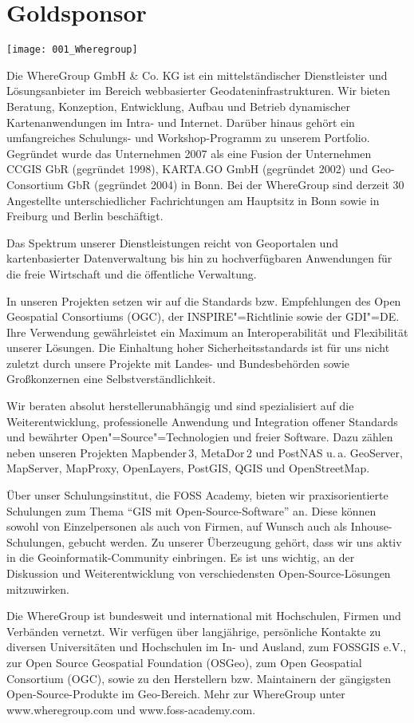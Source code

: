 \section*{Goldsponsor}
\begin{center}
	\texttt{[image: 001\_Wheregroup]}
\end{center}
Die WhereGroup GmbH \& Co. KG ist ein mittelständischer Dienstleister und Lösungsanbieter im Bereich webbasierter
Geodateninfrastrukturen. Wir bieten Beratung, Konzeption, Entwicklung, Aufbau und Betrieb
dynamischer Kartenanwendungen im Intra- und Internet. Darüber hinaus gehört ein umfangreiches
Schulungs- und Workshop-Programm zu unserem Portfolio. Gegründet wurde das Unternehmen 2007 als
eine Fusion der Unternehmen CCGIS GbR (gegründet 1998), KARTA.GO GmbH (gegründet 2002) und
Geo-Consortium GbR (gegründet 2004) in Bonn. Bei der WhereGroup sind derzeit 30 Angestellte
unterschiedlicher Fachrichtungen am Hauptsitz in Bonn sowie in Freiburg und Berlin
beschäftigt.

Das Spektrum unserer Dienstleistungen reicht von Geoportalen und kartenbasierter
Datenverwaltung bis hin zu hochverfügbaren Anwendungen für die freie Wirtschaft und die öffentliche
Verwaltung.

In unseren Projekten setzen wir auf die Standards bzw. Empfehlungen des Open Geospatial
Consortiums (OGC), der INSPIRE"=Richtlinie sowie der GDI"=DE. Ihre Verwendung gewährleistet ein Maximum
an Interoperabilität und Flexibilität unserer Lösungen. Die Einhaltung hoher Sicherheitsstandards
ist für uns nicht zuletzt durch unsere Projekte mit Landes- und Bundesbehörden sowie Großkonzernen
eine Selbst\-ver\-ständ\-lichkeit.

Wir beraten absolut herstellerunabhängig und sind spezialisiert auf die Weiterentwicklung,
professionelle Anwendung und Integration offener Standards und bewährter
Open"=Source"=Technologien und freier Software. Dazu zählen neben unseren Projekten Mapbender\,3,
MetaDor\,2 und PostNAS u.\,a. GeoServer, MapServer, MapProxy, OpenLay\-ers, PostGIS, QGIS und
OpenStreetMap.

Über unser Schulungsinstitut, die FOSS Academy, bieten wir praxisorientierte
Schulungen zum Thema "`GIS mit Open-Source-Software"' an. Diese können sowohl von Einzelpersonen als
auch von Firmen, auf Wunsch auch als Inhouse-Schulungen, gebucht werden.
Zu unserer Überzeugung
gehört, dass wir uns aktiv in die Geoinformatik-Community einbringen. Es ist uns wichtig, an der
Diskussion und Weiterentwicklung von verschiedensten Open-Source-Lösungen mitzuwirken.

\enlargethispage{1.5\baselineskip}
Die WhereGroup ist bundesweit und international mit Hochschulen, Firmen und Verbänden vernetzt. Wir
verfügen über langjährige, persönliche Kontakte zu diversen Universitäten und Hochschulen im In- und
Ausland, zum FOSSGIS e.V., zur Open Source Geospatial Foundation (OSGeo), zum Open Geospatial
Consortium (OGC), sowie zu den Herstellern bzw. Maintainern der gängigsten Open-Source-Produkte im
Geo-Bereich.  Mehr zur WhereGroup unter www.wheregroup.com und www.foss-academy.com.
